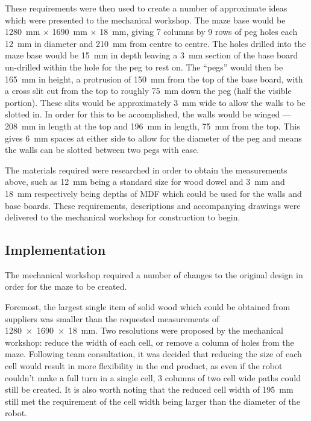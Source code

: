 These requirements were then used to create a number of approximate ideas which 
were presented to the mechanical workshop. The maze base would be \SI{1280}{\mm}
$\times$ \SI{1690}{\mm} $\times$ \SI{18}{\mm}, giving 7 columns by 9 rows of
peg holes each \SI{12}{\mm} in diameter and \SI{210}{\mm} from centre to
centre. The holes drilled into the maze base would be \SI{15}{\mm} in depth 
leaving a \SI{3}{\mm} section of the base board un-drilled within the hole for the peg to rest on. The ``pegs'' would then be 
\SI{165}{\mm} in height, a protrusion of \SI{150}{\mm} from the top of the base board, with a cross slit cut from the top to 
roughly \SI{75}{\mm} down the peg 
(half the visible portion). These slits would be approximately \SI{3}{\mm} wide to allow the walls to be slotted in. In order for 
this to be accomplished, the walls would be winged --- \SI{208}{\mm} in length at the top and \SI{196}{\mm} in length, 
\SI{75}{\mm} from the top. This gives \SI{6}{\mm} spaces at either side to allow for the diameter of the peg and means the walls 
can be slotted between two pegs with ease. 

The materials required were researched in order to obtain the measurements 
above, such as \SI{12}{\mm} being a standard size for wood dowel and \SI{3}{\mm} 
and \SI{18}{\mm} respectively being depths of MDF which could be used for the 
walls and base boards. These requirements, descriptions and accompanying 
drawings were delivered to the mechanical workshop for construction to begin. 

\subsection{Implementation}\label{test/maze/impl}
The mechanical workshop required a number of changes to the original design in 
order for the maze to be created.

Foremost, the largest single item of solid wood which could be obtained from 
suppliers was smaller than the requested measurements of \SI{1280 x 1690 x 18}
{\mm}. Two resolutions were proposed by the mechanical workshop: reduce 
the width of each cell, or remove a column of holes from the maze. Following 
team consultation, it was decided that reducing the size of each cell would 
result in more flexibility in the end product, as even if the robot couldn't 
make a full turn in a single cell, 3 columns of two cell wide paths could still 
be created. It is also worth noting that the reduced cell width of \SI{195}{\mm} 
still met the requirement of the cell width being larger than the diameter of 
the robot. 

